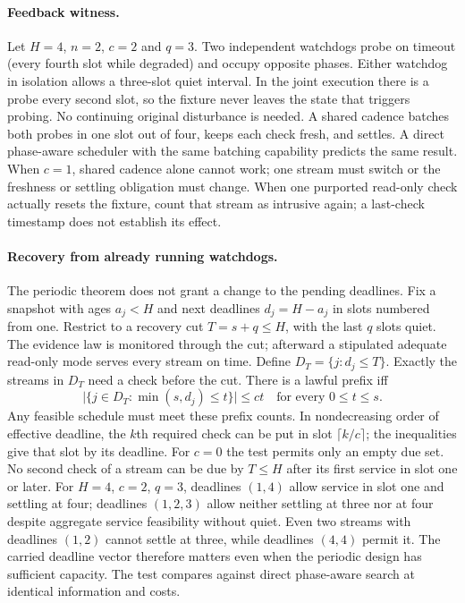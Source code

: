 \documentclass{article}
\begin{document}
\paragraph{Feedback witness.}
Let $H=4$, $n=2$, $c=2$ and $q=3$. Two independent watchdogs probe on
timeout (every fourth slot while degraded) and occupy opposite phases.
Either watchdog in isolation allows a three-slot quiet interval. In the joint
execution there is a probe every second slot, so the fixture never leaves the state
that triggers probing. No continuing original disturbance is needed.
A shared cadence batches both probes in one slot out of four, keeps each check
fresh, and settles. A direct phase-aware scheduler with the same batching
capability predicts the same result. When $c=1$, shared cadence alone cannot
work; one stream must switch or the freshness or settling obligation must change.
When one purported read-only check actually resets the fixture, count that
stream as intrusive again; a last-check timestamp does not establish its effect.

\paragraph{Recovery from already running watchdogs.}
The periodic theorem does not grant a change to the pending deadlines. Fix
a snapshot with ages $a_j<H$ and next deadlines $d_j=H-a_j$ in slots numbered
from one. Restrict to a recovery cut $T=s+q\le H$, with the last $q$ slots
quiet. The evidence law is monitored through the cut; afterward a stipulated
adequate read-only mode serves every stream on time. Define $D_T=\{j:d_j\le T\}$.
Exactly the streams in $D_T$ need a check before the cut. There is a lawful
prefix iff
\[
       \big|\{j\in D_T:\min(s,d_j)\le t\}\big|\le c t
       \quad\text{for every }0\le t\le s.
\]
Any feasible schedule must meet these prefix counts. In nondecreasing order
of effective deadline, the $k$th required check can be put in slot
$\lceil k/c\rceil$; the inequalities give that slot by its deadline.
For $c=0$ the test permits only an empty due set. No second check of a
stream can be due by $T\le H$ after its first service in slot one or later.
For $H=4$, $c=2$, $q=3$, deadlines $(1,4)$ allow service in slot one
and settling at four; deadlines $(1,2,3)$ allow neither settling at three
nor at four despite aggregate service feasibility without quiet. Even two
streams with deadlines $(1,2)$ cannot settle at three, while deadlines
$(4,4)$ permit it. The carried deadline vector therefore matters even
when the periodic design has sufficient capacity. The test compares
against direct phase-aware search at identical information and costs.
\end{document}
